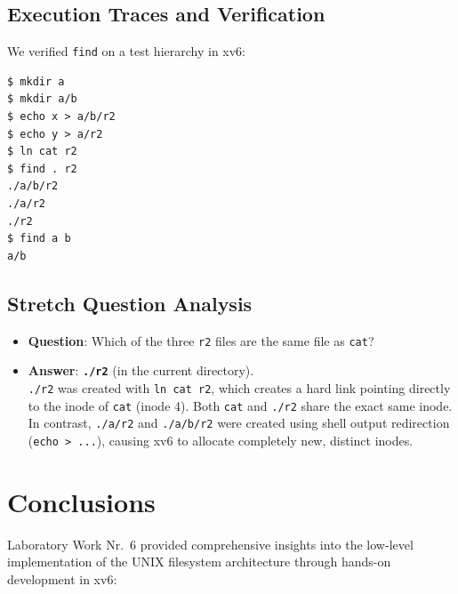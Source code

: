 \documentclass[12pt,a4paper]{article}
\begin{document}
\subsection{Execution Traces and Verification}
We verified \texttt{find} on a test hierarchy in xv6:

\begin{lstlisting}[style=consolestyle]
$ mkdir a
$ mkdir a/b
$ echo x > a/b/r2
$ echo y > a/r2
$ ln cat r2
$ find . r2
./a/b/r2
./a/r2
./r2
$ find a b
a/b
\end{lstlisting}

\subsection{Stretch Question Analysis}
\begin{itemize}
    \item \textbf{Question}: Which of the three \texttt{r2} files are the same file as \texttt{cat}?
    \item \textbf{Answer}: \textbf{\texttt{./r2}} (in the current directory). \\
    \texttt{./r2} was created with \texttt{ln cat r2}, which creates a hard link pointing directly to the inode of \texttt{cat} (inode 4). Both \texttt{cat} and \texttt{./r2} share the exact same inode. In contrast, \texttt{./a/r2} and \texttt{./a/b/r2} were created using shell output redirection (\texttt{echo > ...}), causing xv6 to allocate completely new, distinct inodes.
\end{itemize}

\newpage

\section{Conclusions}
Laboratory Work Nr.~6 provided comprehensive insights into the low-level implementation of the UNIX filesystem architecture through hands-on development in xv6:
\end{document}
